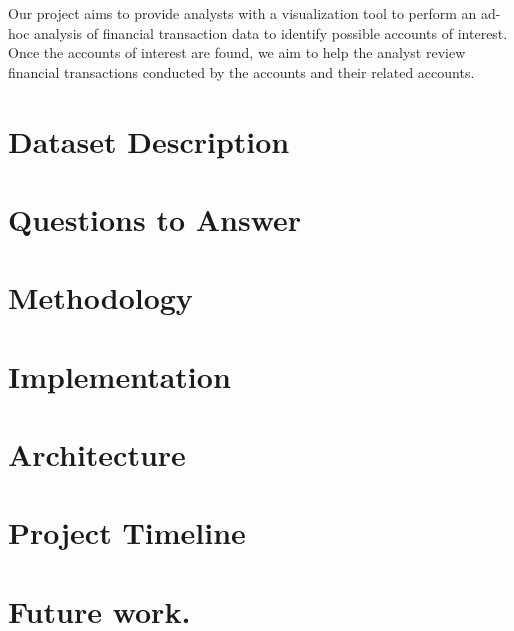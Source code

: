 \documentclass[10pt,conference]{IEEEtran}
\begin{document}
\textnormal{
 Our project aims to provide analysts with a visualization tool to perform an ad-hoc analysis of financial transaction data to identify possible accounts of interest. Once the accounts of interest are found, we aim to help the analyst review financial transactions conducted by the accounts and their related accounts.
}


\section{Dataset Description }\label{sec:1 Dataset Description. }

\vspace{\baselineskip}

\section{Questions to Answer}\label{sec: Questions to Answer.}

\vspace{\baselineskip} 

\section{Methodology}\label{sec: Methodology}

\vspace{\baselineskip} 

\section{Implementation }\label{sec: Implementation}


\section{Architecture }\label{sec: Architecture.}


\section{Project Timeline}\label{sec:5. Project Timeline}


\section{Future work.}\label{sec: Future work}




\end{document}
